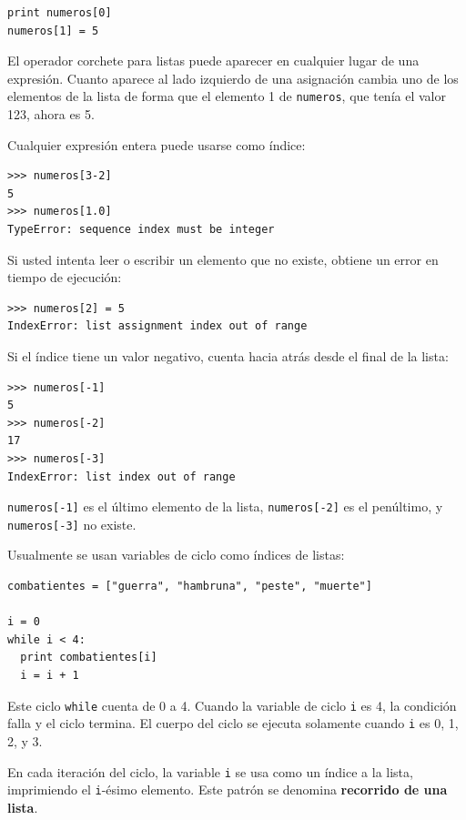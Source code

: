 \beforeverb
\begin{verbatim}
print numeros[0]
numeros[1] = 5
\end{verbatim}
\afterverb
%
El operador corchete para listas puede aparecer en cualquier lugar
de una expresión. Cuanto aparece al lado izquierdo de una asignación
cambia uno de los elementos de la lista de forma que el elemento 1
de  \texttt{numeros}, que tenía el valor 123, ahora es 5.

Cualquier expresión entera puede usarse como índice:

\beforeverb
\begin{verbatim}
>>> numeros[3-2]
5
>>> numeros[1.0]
TypeError: sequence index must be integer
\end{verbatim}
\afterverb
%
Si usted intenta leer o escribir un elemento que no existe, obtiene
un error en tiempo de ejecución:


\beforeverb
\begin{verbatim}
>>> numeros[2] = 5
IndexError: list assignment index out of range
\end{verbatim}
\afterverb
%
Si el índice tiene un valor negativo, cuenta hacia atrás desde el 
final de la lista:

\beforeverb
\begin{verbatim}
>>> numeros[-1]
5
>>> numeros[-2]
17
>>> numeros[-3]
IndexError: list index out of range
\end{verbatim}
\afterverb
%
\texttt{numeros[-1]} es el último elemento de la  lista, \texttt{numeros[-2]}
es el penúltimo, y \texttt{numeros[-3]} no existe.

Usualmente se usan variables de ciclo como índices de listas:

\beforeverb
\begin{verbatim}
combatientes = ["guerra", "hambruna", "peste", "muerte"]

i = 0
while i < 4:
  print combatientes[i]
  i = i + 1
\end{verbatim}
\afterverb
%
Este ciclo \texttt{while} cuenta de 0 a 4.  Cuando la variable de ciclo
\texttt{i} es 4, la condición falla y el ciclo termina.  El cuerpo del ciclo 
se ejecuta solamente cuando \texttt{i} es 0, 1, 2, y 3.

En cada iteración del ciclo, la variable \texttt{i} se usa como un índice
a la lista, imprimiendo el \texttt{i}-ésimo elemento.  Este patrón
se denomina {\bf recorrido de una lista}.



